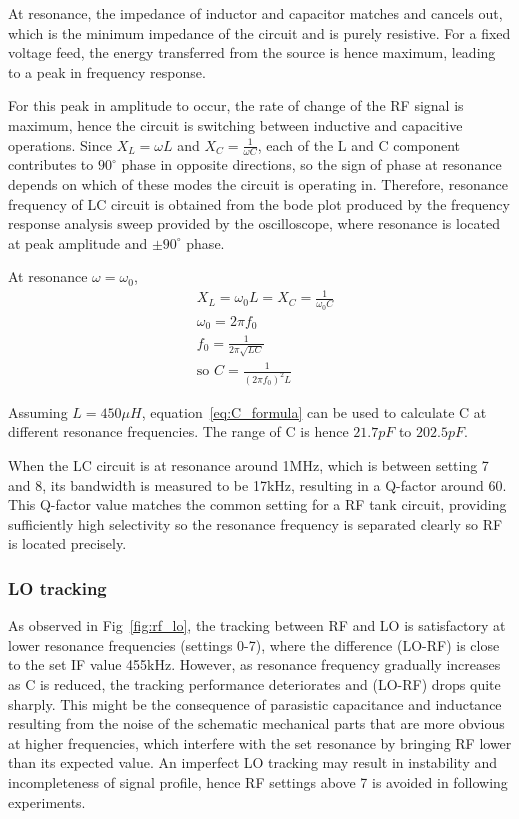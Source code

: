 \documentclass[a4paper,12pt]{article}
\begin{document}
At resonance, the impedance of inductor and capacitor matches and cancels out, which is the minimum impedance of the circuit and is purely resistive. For a fixed voltage feed, the energy transferred from the source is hence maximum, leading to a peak in frequency response.

For this peak in amplitude to occur, the rate of change of the RF signal is maximum, hence the circuit is switching between inductive and capacitive operations. Since $X_L=\omega L$ and $X_C=\frac{1}{\omega C}$, each of the L and C component contributes to $90 ^\circ$ phase in opposite directions, so the sign of phase at resonance depends on which of these modes the circuit is operating in.
Therefore, resonance frequency of LC circuit is obtained from the bode plot produced by the frequency response analysis sweep provided by the oscilloscope, where resonance is located at peak amplitude and $\pm 90 ^\circ$ phase.

At resonance $\omega = \omega_0$, 
\begin{align}
    & X_L=\omega_0 L= X_C=\frac{1}{\omega_0 C}\\
    & \omega_0 = 2\pi f_0\\
    & f_0 = \frac{1}{2\pi \sqrt{LC}}\\
    & \text{so } C = \frac{1}{(2\pi f_0)^2 L} \label{eq:C_formula}
\end{align}

Assuming $L=450\mu H$, equation~\eqref{eq:C_formula} can be used to calculate C at different resonance frequencies. The range of C is hence $21.7pF$ to $202.5pF$.

When the LC circuit is at resonance around 1MHz, which is between setting 7 and 8, its bandwidth is measured to be 17kHz, resulting in a Q-factor around 60. This Q-factor value matches the common setting for a RF tank circuit, providing sufficiently high selectivity so the resonance frequency is separated clearly so RF is located precisely.

\subsubsection{LO tracking}
As observed in Fig~\ref{fig:rf_lo}, the tracking between RF and LO is satisfactory at lower resonance frequencies (settings 0-7), where the difference (LO-RF) is close to the set IF value 455kHz.
However, as resonance frequency gradually increases as C is reduced, the tracking performance deteriorates and (LO-RF) drops quite sharply. 
This might be the consequence of parasistic capacitance and inductance resulting from the noise of the schematic mechanical parts that are more obvious at higher frequencies, which interfere with the set resonance by bringing RF lower than its expected value. 
An imperfect LO tracking may result in instability and incompleteness of signal profile, hence RF settings above 7 is avoided in following experiments.
\end{document}
